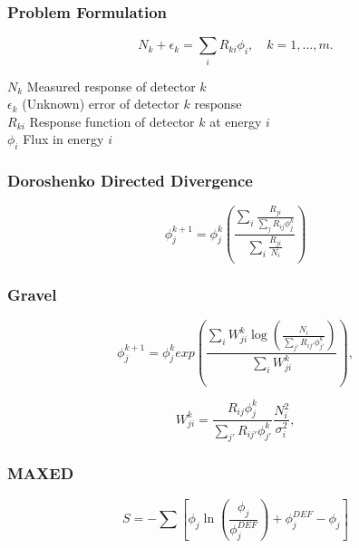 \documentclass[fleqn]{beamer}
\begin{document}
\begin{frame}
\frametitle{Problem Formulation}
\begin{equation}
\label{eqn:disc-response}
N_k + \epsilon_k = \sum_i R_{ki} \phi_i, \quad k = 1,\ldots, m .
\end{equation}

$N_k$ Measured response of detector $k$\\
$\epsilon_k$ (Unknown) error of detector $k$ response\\
$R_{ki}$ Response function of detector $k$ at energy $i$\\
$\phi_i$ Flux in energy $i$\\

\end{frame}


\begin{frame}
\frametitle{Doroshenko Directed Divergence}

\begin{equation}
\label{eqn:doroshenko}
\phi_j^{k + 1} = \phi_j^{k} (\frac{\sum_i \frac{R_{ji}}{\sum_j R_{ij} \phi_j^k}}{\sum_i \frac{R_{ji}}{N_i}}) 
\end{equation}

\end{frame}

\begin{frame}
\frametitle{Gravel}

\begin{equation}
\label{eqn:sandii}
\phi_j^{k + 1} = \phi_j^{k} exp(\frac{\sum_i W_{ji}^k \log(\frac{N_i}{\sum_{j'} R_{ij'} \phi_{j'}^k})}{\sum_i W_{ji}^k}) ,
\end{equation}

\begin{equation}
\label{eqn:gravel-w}
W_{ji}^k = \frac{R_{ij} \phi_{j}^k}{\sum_{j'} R_{ij'} \phi_{j'}^k} \frac{N_i^2}{\sigma_i^2} ,
\end{equation}
\end{frame}

\begin{frame}
\frametitle{MAXED}
\begin{equation}
\label{eqn:maxed-skilling}
S = - \sum [\phi_j \ln (\frac{\phi_j}{\phi_j^{DEF}}) + \phi_j^{DEF} - \phi_j]
\end{equation}
\end{frame}
\end{document}
